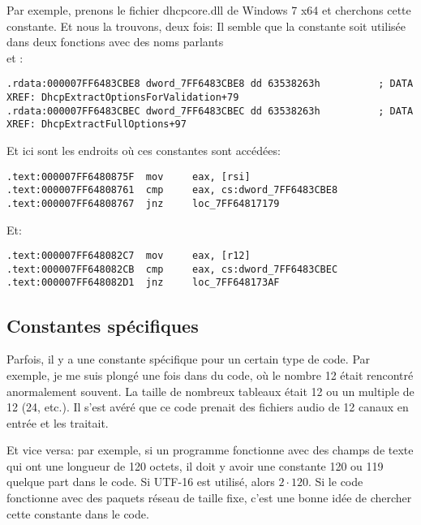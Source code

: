 Par exemple, prenons le fichier dhcpcore.dll de Windows 7 x64 et cherchons cette constante.
Et nous la trouvons, deux fois:
Il semble que la constante soit utilisée dans deux fonctions avec des noms parlants\\
 et :

\begin{lstlisting}[caption=dhcpcore.dll (Windows 7 x64),style=customasmx86]
.rdata:000007FF6483CBE8 dword_7FF6483CBE8 dd 63538263h          ; DATA XREF: DhcpExtractOptionsForValidation+79
.rdata:000007FF6483CBEC dword_7FF6483CBEC dd 63538263h          ; DATA XREF: DhcpExtractFullOptions+97
\end{lstlisting}

Et ici sont les endroits où ces constantes sont accédées:

\begin{lstlisting}[caption=dhcpcore.dll (Windows 7 x64),style=customasmx86]
.text:000007FF6480875F  mov     eax, [rsi]
.text:000007FF64808761  cmp     eax, cs:dword_7FF6483CBE8
.text:000007FF64808767  jnz     loc_7FF64817179
\end{lstlisting}

Et:

\begin{lstlisting}[caption=dhcpcore.dll (Windows 7 x64),style=customasmx86]
.text:000007FF648082C7  mov     eax, [r12]
.text:000007FF648082CB  cmp     eax, cs:dword_7FF6483CBEC
.text:000007FF648082D1  jnz     loc_7FF648173AF
\end{lstlisting}

\subsection{Constantes spécifiques}

Parfois, il y a une constante spécifique pour un certain type de code.
Par exemple, je me suis plongé une fois dans du code, où le nombre 12 était rencontré
anormalement souvent.
La taille de nombreux tableaux était 12 ou un multiple de 12 (24, etc.).
Il s'est avéré que ce code prenait des fichiers audio de 12 canaux en entrée et les
traitait.

Et vice versa: par exemple, si un programme fonctionne avec des champs de texte qui
ont une longueur de 120 octets, il doit y avoir une constante 120 ou 119 quelque
part dans le code.
Si UTF-16 est utilisé, alors $2 \cdot 120$.
Si le code fonctionne avec des paquets réseau de taille fixe, c'est une bonne idée
de chercher cette constante dans le code.

